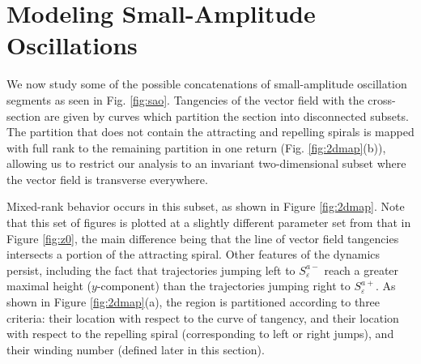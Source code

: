 \documentclass[aip, cha, sd, amsmath,amssymb, preprint]{revtex4-1}
\begin{document}
\section{\label{sec:sao} Modeling Small-Amplitude Oscillations}

We now study some of the possible concatenations of small-amplitude oscillation segments as seen in Fig. \ref{fig:sao}.  Tangencies of the vector field with the cross-section are given by curves which partition the section into disconnected subsets. The partition that does not contain the attracting and repelling spirals is mapped with full rank to the remaining partition in one return (Fig. \ref{fig:2dmap}(b)), allowing us to restrict our analysis to an invariant two-dimensional subset where the vector field is transverse everywhere. 

Mixed-rank behavior occurs in this subset, as shown in Figure \ref{fig:2dmap}. Note that this set of figures is plotted at a slightly different parameter set from that in Figure \ref{fig:z0}, the main difference being that the line of vector field tangencies intersects a portion of the attracting spiral. Other features of the dynamics persist, including the fact that trajectories jumping left to $S^{a-}_{ \varepsilon}$ reach a greater maximal height ($y$-component) than the trajectories jumping right to $S^{a+}_{ \varepsilon}$.  As shown in Figure \ref{fig:2dmap}(a), the region is partitioned according to three criteria: their location with respect to the curve of tangency, and their location with respect to the repelling spiral (corresponding to left or right jumps), and their winding number (defined later in this section). 
\end{document}
